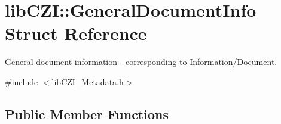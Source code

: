 \hypertarget{structlib_c_z_i_1_1_general_document_info}{}\section{lib\+C\+ZI\+:\+:General\+Document\+Info Struct Reference}
\label{structlib_c_z_i_1_1_general_document_info}


General document information -\/ corresponding to Information/\+Document.  




{\ttfamily \#include $<$lib\+C\+Z\+I\+\_\+\+Metadata.\+h$>$}

\subsection*{Public Member Functions}
